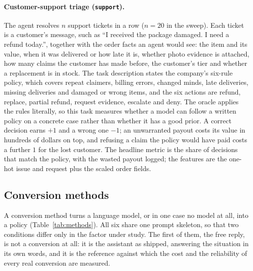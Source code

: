 \paragraph{Customer-support triage (\texttt{support}).}
The agent resolves $n$ support tickets in a row ($n=20$ in the sweep). Each ticket is a customer's message, such as ``I received the package damaged. I need a refund today.'', together with the order facts an agent would see: the item and its value, when it was delivered or how late it is, whether photo evidence is attached, how many claims the customer has made before, the customer's tier and whether a replacement is in stock. The task description states the company's six-rule policy, which covers repeat claimers, billing errors, changed minds, late deliveries, missing deliveries and damaged or wrong items, and the six actions are refund, replace, partial refund, request evidence, escalate and deny. The oracle applies the rules literally, so this task measures whether a model can follow a written policy on a concrete case rather than whether it has a good prior. A correct decision earns $+1$ and a wrong one $-1$; an unwarranted payout costs its value in hundreds of dollars on top, and refusing a claim the policy would have paid costs a further $1$ for the lost customer. The headline metric is the share of decisions that match the policy, with the wasted payout logged; the features are the one-hot issue and request plus the scaled order fields.

\subsection{Conversion methods}
\label{sec:bench:methods}

A conversion method turns a language model, or in one case no model at all, into a policy (Table~\ref{tab:methods}). All six share one prompt skeleton, so that two conditions differ only in the factor under study. The first of them, the free reply, is not a conversion at all: it is the assistant as shipped, answering the situation in its own words, and it is the reference against which the cost and the reliability of every real conversion are measured.


